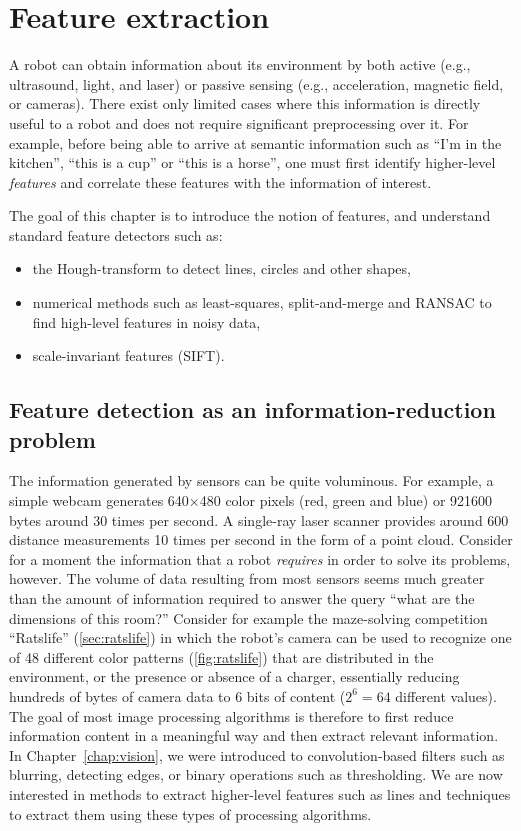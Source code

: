 \chapter{Feature extraction}\label{chap:feature_extraction}

A robot can obtain information about its environment by both active (e.g., ultrasound, light, and laser) or passive sensing (e.g., acceleration, magnetic field, or cameras). There exist only limited cases where this information is directly useful to a robot and does not require significant preprocessing over it. For example, before being able to arrive at semantic information such as ``I'm in the kitchen'', ``this is a cup'' or ``this is a horse'', one must first identify higher-level \textsl{features} and correlate these features with the information of interest.

The goal of this chapter is to introduce the notion of features, and understand standard feature detectors such as:

\begin{itemize}
    \item the Hough-transform to detect lines, circles and other shapes,
    \item numerical methods such as least-squares, split-and-merge and RANSAC to find high-level features in noisy data,
    \item scale-invariant features (SIFT).
\end{itemize}

\section{Feature detection as an information-reduction problem}
The information generated by sensors can be quite voluminous. For example, a simple webcam generates 640$\times$480 color pixels (red, green and blue) or 921600 bytes around 30 times per second. A single-ray laser scanner provides around 600 distance measurements 10 times per second in the form of a point cloud. Consider for a moment the information that a robot \emph{requires} in order to solve its problems, however. The volume of data resulting from most sensors seems much greater than the amount of information required to answer the query ``what are the dimensions of this room?'' Consider for example the maze-solving competition ``Ratslife'' (\cref{sec:ratslife}) in which the robot's camera can be used to recognize one of 48 different color patterns (\cref{fig:ratslife}) that are distributed in the environment, or the presence or absence of a charger, essentially reducing hundreds of bytes of camera data to 6 bits of content ($2^6=64$ different values). The goal of most image processing algorithms is therefore to first reduce information content in a meaningful way and then extract relevant information. In Chapter~\ref{chap:vision}, we were introduced to convolution-based filters such as blurring, detecting edges, or binary operations such as thresholding. We are now interested in methods to extract higher-level features such as lines and techniques to extract them using these types of processing algorithms.

